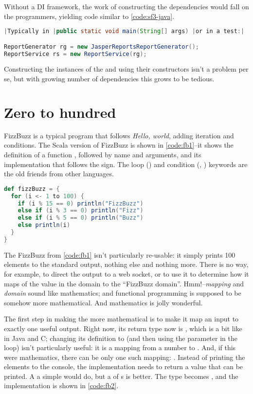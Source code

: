 \documentclass[10 pt]{article}
\begin{document}
Without a DI framework, the work of constructing the dependencies would fall on the programmers, yielding code similar to \autoref{code:sf3-java}.

\begin{lstlisting}[caption={Manual DI}, label={code:sf3-java}, language=Java, escapechar=|]
|Typically in |public static void main(String[] args) |or in a test:|

ReportGenerator rg = new JasperReportsReportGenerator();
ReportService rs = new ReportService(rg);
\end{lstlisting}

Constructing the instances of the  and  using their constructors isn't a problem per se, but with growing number of dependencies this grows to be tedious.


\section{Zero to hundred}
FizzBuzz is a typical program that follows \emph{Hello, world}, adding iteration and conditions. The Scala version of FizzBuzz is shown in \autoref{code:fb1}--it shows the definition of a function , followed by name and arguments, and its implementation that follows the \pcode{=} sign. The loop () and condition (, ) keywords are the old friends from other languages. 

\begin{lstlisting}[caption={Fizz Buzz}, label={code:fb1}, language=Scala, escapechar=|]
def fizzBuzz = {
  for (i <- 1 to 100) {
    if (i % 15 == 0) println("FizzBuzz")
    else if (i % 3 == 0) println("Fizz")
    else if (i % 5 == 0) println("Buzz")
    else println(i)
  }
}
\end{lstlisting}

The FizzBuzz from \autoref{code:fb1} isn't particularly re-usable: it simply prints 100 elements to the standard output, nothing else and nothing more. There is no way, for example, to direct the output to a web socket, or to use it to determine how it maps of the value in the  domain to the ``FizzBuzz domain''. Hmm!--\emph{mapping} and \emph{domain} sound like mathematics; and functional programming is supposed to be somehow more mathematical. And mathematics is jolly wonderful. 

The first step in making the  more mathematical is to make it map an input to exactly one useful output. Right now, its return type now is , which is a bit like  in Java and C; changing its definition to  (and then using the  parameter in the loop) isn't particularly useful: it is a mapping from a number to . And, if this were mathematics, there can be only one such mapping: . Instead of printing the elements to the console, the implementation needs to return a value that can be printed. A a simple  would do, but a  of s is better. The type becomes , and the implementation is shown in \autoref{code:fb2}.
\end{document}

